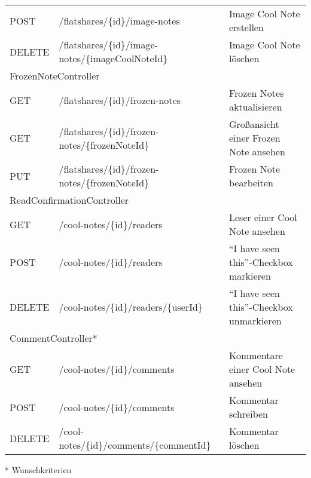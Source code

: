\documentclass[a4paper]{scrreprt}
\begin{document}
\begin{flushleft}
\begin{longtable}{|p{}|p{}|p{}|}
		POST & /flatshares/\{id\}/image-notes & Image Cool Note erstellen \\
		DELETE & /flatshares/\{id\}/image-notes/\{imageCoolNoteId\} & Image Cool Note löschen \\
		\hline	
		\multicolumn{3}{|l|}{FrozenNoteController} \\
		\hline
		GET & /flatshares/\{id\}/frozen-notes & Frozen Notes aktualisieren \\
		GET & /flatshares/\{id\}/frozen-notes/\{frozenNoteId\} & Großansicht einer Frozen Note ansehen \\
		PUT & /flatshares/\{id\}/frozen-notes/\{frozenNoteId\} & Frozen Note bearbeiten \\
		\hline
		\multicolumn{3}{|l|}{ReadConfirmationController} \\
		\hline
		GET & /cool-notes/\{id\}/readers & Leser einer Cool Note ansehen \\
		POST & /cool-notes/\{id\}/readers & ``I have seen this''-Checkbox markieren \\
		DELETE & /cool-notes/\{id\}/readers/\{userId\} & ``I have seen this''-Checkbox unmarkieren \\
		\hline
		\multicolumn{3}{|l|}{CommentController*} \\
		\hline
		GET & /cool-notes/\{id\}/comments & Kommentare einer Cool Note ansehen \\
		POST & /cool-notes/\{id\}/comments & Kommentar schreiben \\
		DELETE & /cool-notes/\{id\}/comments/\{commentId\} & Kommentar löschen \\
		\hline
		\end{longtable}
	\end{flushleft}
	* Wunschkriterien
	
	\newpage
\end{document}

